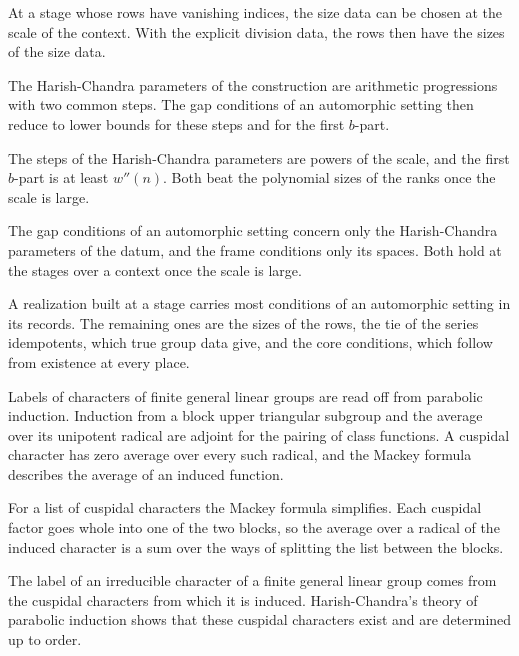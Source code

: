 At a stage whose rows have vanishing indices, the size data can be chosen at
the scale of the context. With the explicit division data, the rows then have
the sizes of the size data.

The Harish-Chandra parameters of the construction are arithmetic progressions with two common
steps. The gap conditions of an automorphic setting then reduce to lower bounds for these steps
and for the first $b$-part.

The steps of the Harish-Chandra parameters are powers of the scale, and the first $b$-part is at
least $w''(n)$. Both beat the polynomial sizes of the ranks once the scale is large.

The gap conditions of an automorphic setting concern only the Harish-Chandra
parameters of the datum, and the frame conditions only its spaces. Both hold at
the stages over a context once the scale is large.

A realization built at a stage carries most conditions of an automorphic
setting in its records. The remaining ones are the sizes of the rows, the tie of
the series idempotents, which true group data give, and the core conditions,
which follow from existence at every place.

Labels of characters of finite general linear groups are read off from parabolic induction. Induction
from a block upper triangular subgroup and the average over its unipotent radical are adjoint for the
pairing of class functions. A cuspidal character has zero average over every such radical, and the
Mackey formula describes the average of an induced function.

For a list of cuspidal characters the Mackey formula simplifies. Each cuspidal factor goes whole into
one of the two blocks, so the average over a radical of the induced character is a sum over the ways of
splitting the list between the blocks.

The label of an irreducible character of a finite general linear group comes from the cuspidal
characters from which it is induced. Harish-Chandra's theory of parabolic induction shows that these
cuspidal characters exist and are determined up to order.

